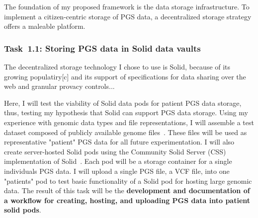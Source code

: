 \documentclass[a4paper,11pt]{article}
\begin{document}
\begin{refsection}
The foundation of my proposed framework is the data storage infrastructure.
To implement a citizen-centric storage of PGS data, a decentralized storage strategy offers a maleable platform.


\newcommand\WPaa{Storing PGS data in Solid data vaults}
\subsubsection{Task~1.1: \WPaa}

The decentralized storage technology I chose to use is Solid, because of its growing populatiry[c] and its support of specifications for data sharing over the web and granular provacy controls... %

Here, I will test the viability of Solid data pods for patient PGS data storage, thus, testing my hypothesis that Solid can support PGS data storage. 
Using my experience with genomic data types and file representations, I will assemble a test dataset composed of publicly available genome files~\cite{noauthor_platinum_nodate}. 
These files will be used as representative "patient" PGS data for all future experimentation. 
I will also create server-hosted Solid pods using the Community Solid Server (CSS) implementation of Solid~\cite{css}. 
Each pod will be a storage container for a single individual\textquotesingle s PGS data. 
I will upload a single PGS file, a VCF file, into one "patient\textquotesingle s" pod to test basic functionality of a Solid pod for hosting large genomic data. 
The result of this task will be the \textbf{development and documentation of a workflow for creating, hosting, and uploading PGS data into patient solid pods}.




\end{refsection}
\end{document}
